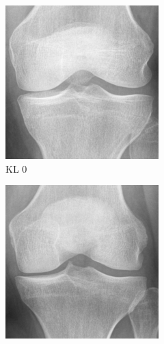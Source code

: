 \documentclass[11pt,spanish,listoffigures,listoftables]{tfgetsinf}
\begin{document}
\begin{figure}[htbp]
    \centering
    \begin{subfigure}[b]{0.19\textwidth}
        \includegraphics[width=\textwidth]{knee_0.png}
        \caption{KL 0}
        \label{fig:knee0}
    \end{subfigure}
    \hfill
    \begin{subfigure}[b]{0.19\textwidth}
        \includegraphics[width=\textwidth]{knee_1.png}

\end{subfigure}
\end{figure}
\end{document}
